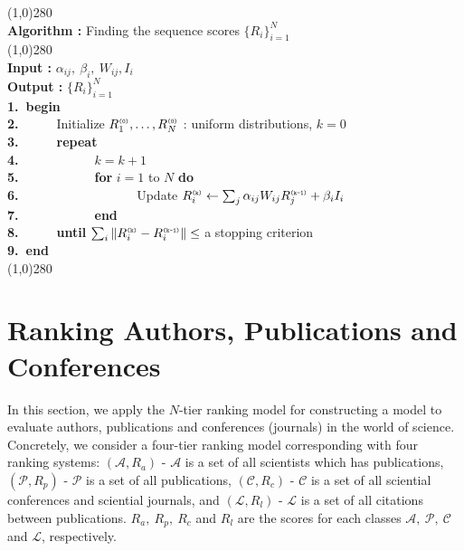 \documentclass[lnicst]{svmultln}
\begin{document}
\line(1,0){280}
~\\
{\bf Algorithm :} Finding the sequence scores $\{R_i\}^N_{i=1}$
~\\[-2mm]
\line(1,0){280}\\
\vspace{2mm}\enskip\enskip\textbf{Input :} $\alpha_{ij},~\beta_i,~W_{ij},I_i$\\
\vspace{2mm}\enskip\enskip\textbf{Output :} $\{R_i\}^N_{i=1}$\\
\textbf{{\scriptsize 1.}~begin}\\
\textbf{{\scriptsize 2.}}~~~~~~Initialize $R^{\texttt{\tiny(0)}}_1,\ldots,R^{\texttt{\tiny(0)}}_N$ : uniform distributions, $k = 0$\\
\textbf{{\scriptsize 3.}}~~~~~~{\bf repeat}\\
\textbf{{\scriptsize 4.}}~~~~~~~~~~~~$k = k + 1$\\
\textbf{{\scriptsize 5.}}~~~~~~~~~~~~{\bf for} $i = 1$ to $N$ {\bf do}\\
\textbf{{\scriptsize 6.}}~~~~~~~~~~~~~~~~~~ Update $R^{\texttt{\tiny(k)}}_i \leftarrow \sum_j\alpha_{ij}W_{ij}R^{\texttt{\tiny(k-1)}}_j + \beta_iI_i$\\
\textbf{{\scriptsize 7.}}~~~~~~~~~~~~{\bf end}\\
\textbf{{\scriptsize 8.}}~~~~~~{\bf until} $\sum_i\|R^{\texttt{\tiny(k)}}_i - R^{\texttt{\tiny(k-1)}}_i\| \leq$ a stopping criterion\\
\textbf{{\scriptsize 9.}~end}
~\\[-2mm]
\line(1,0){280}


\section{Ranking Authors, Publications and Conferences}\label{Sect:Ranking}
In this section, we apply the $N$-tier ranking model for constructing a model to evaluate authors, publications and conferences (journals) in the world of science. Concretely, we consider a four-tier ranking model corresponding with four ranking systems: $(\mathcal{A},R_a)$ - $\mathcal{A}$ is a set of all scientists which has publications, $(\mathcal{P},R_p)$ - $\mathcal{P}$ is a set of all publications, $(\mathcal{C},R_c)$ - $\mathcal{C}$ is a set of all sciential conferences and sciential journals, and $(\mathcal{L},R_l)$ - $\mathcal{L}$ is a set of all citations between publications. $R_a,~R_p,~R_c$ and $R_l$ are the scores for each classes $\mathcal{A},~\mathcal{P},~\mathcal{C}$ and $\mathcal{L}$, respectively.
\setlength{\parskip}{6pt}
\end{document}
